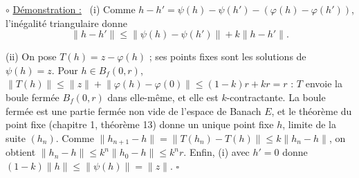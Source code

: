 \documentclass[a4paper,twoside]{report}
\newenvironment{demo}%
 {\par\needspace{4\baselineskip}\vspace{1mm}\noindent$\circ$ \underline{Démonstration :}~\setlength{\parskip}{3pt plus 1pt}}%
 {\hfill$\square$\par\vspace{2mm}}
\newcommand{\norme}[1]{\lVert #1 \rVert}         %
\newcommand{\Bf}{B_{f}}                           %
\begin{document}
\begin{demo}
(i) Comme $h - h' = \psi(h) - \psi(h') - (\varphi(h) - \varphi(h'))$, l'inégalité triangulaire donne
\[ \norme{h - h'} \leqslant \norme{\psi(h) - \psi(h')} + k\norme{h - h'}. \]

(ii) On pose $T(h) = z - \varphi(h)$ ; ses points fixes sont les solutions de $\psi(h) = z$. Pour $h \in \Bf(0, r)$, $\norme{T(h)} \leqslant \norme{z} + \norme{\varphi(h) - \varphi(0)} \leqslant (1 - k)r + kr = r$ : $T$ envoie la boule fermée $\Bf(0, r)$ dans elle-même, et elle est $k$-contractante. La boule fermée est une partie fermée non vide de l'espace de Banach $E$, et le théorème du point fixe (chapitre 1, théorème 13) donne un unique point fixe $h$, limite de la suite $(h_{n})$. Comme $\norme{h_{n + 1} - h} = \norme{T(h_{n}) - T(h)} \leqslant k\norme{h_{n} - h}$, on obtient $\norme{h_{n} - h} \leqslant k^{n}\norme{h_{0} - h} \leqslant k^{n}r$. Enfin, (i) avec $h' = 0$ donne $(1 - k)\norme{h} \leqslant \norme{\psi(h)} = \norme{z}$.
\end{demo}
\end{document}
